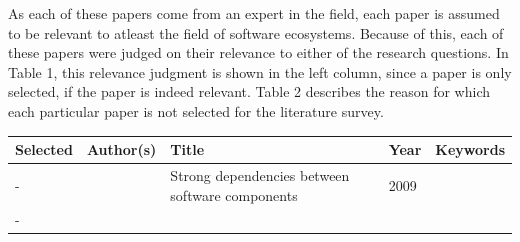 \documentclass[]{book}
\begin{document}
As each of these papers come from an expert in the field, each paper is
assumed to be relevant to atleast the field of software ecosystems.
Because of this, each of these papers were judged on their relevance to
either of the research questions. In Table 1, this relevance judgment is
shown in the left column, since a paper is only selected, if the paper
is indeed relevant. Table 2 describes the reason for which each
particular paper is not selected for the literature survey.

\begin{longtable}[]{@{}lllll@{}}
\toprule
\begin{minipage}[b]{0.01\columnwidth}\raggedright\strut
Selected\strut
\end{minipage} & \begin{minipage}[b]{0.09\columnwidth}\raggedright\strut
Author(s)\strut
\end{minipage} & \begin{minipage}[b]{0.34\columnwidth}\raggedright\strut
Title\strut
\end{minipage} & \begin{minipage}[b]{0.02\columnwidth}\raggedright\strut
Year\strut
\end{minipage} & \begin{minipage}[b]{0.39\columnwidth}\raggedright\strut
Keywords\strut
\end{minipage}\tabularnewline
\midrule
\endhead
\begin{minipage}[t]{0.01\columnwidth}\raggedright\strut
-\strut
\end{minipage} & \begin{minipage}[t]{0.09\columnwidth}\raggedright\strut
\citet{Abate2009}\strut
\end{minipage} & \begin{minipage}[t]{0.34\columnwidth}\raggedright\strut
Strong dependencies between software components\strut
\end{minipage} & \begin{minipage}[t]{0.02\columnwidth}\raggedright\strut
2009\strut
\end{minipage} & \begin{minipage}[t]{0.39\columnwidth}\raggedright\strut
\strut
\end{minipage}\tabularnewline
\begin{minipage}[t]{0.01\columnwidth}\raggedright\strut
-\strut
\end{minipage} & \begin{minipage}[t]{0.09\columnwidth}\raggedright\strut

\end{minipage}
\end{longtable}
\end{document}

